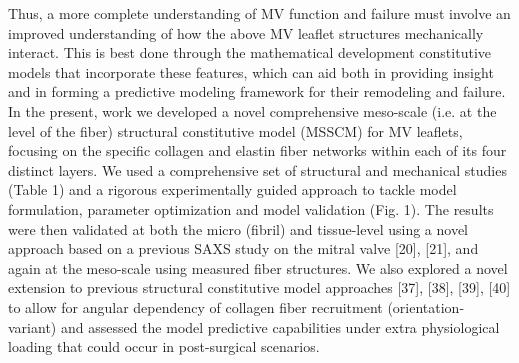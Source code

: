     
    Thus, a more complete understanding of MV function and failure must involve an improved understanding of how the above MV leaflet structures mechanically interact. This is best done through the mathematical development constitutive models that incorporate these features, which can aid both in providing insight and in forming a predictive modeling framework for their remodeling and failure. In the present, work we developed a novel comprehensive meso-scale (i.e. at the level of the fiber) structural constitutive model (MSSCM) for MV leaflets, focusing on the specific collagen and elastin fiber networks within each of its four distinct layers. We used a comprehensive set of structural and mechanical studies (Table 1) and a rigorous experimentally guided approach to tackle model formulation, parameter optimization and model validation (Fig. 1). The results were then validated at both the micro (fibril) and tissue-level using a novel approach based on a previous SAXS study on the mitral valve [20], [21], and again at the meso-scale using measured fiber structures. We also explored a novel extension to previous structural constitutive model approaches [37], [38], [39], [40] to allow for angular dependency of collagen fiber recruitment (orientation-variant) and assessed the model predictive capabilities under extra physiological loading that could occur in post-surgical scenarios.